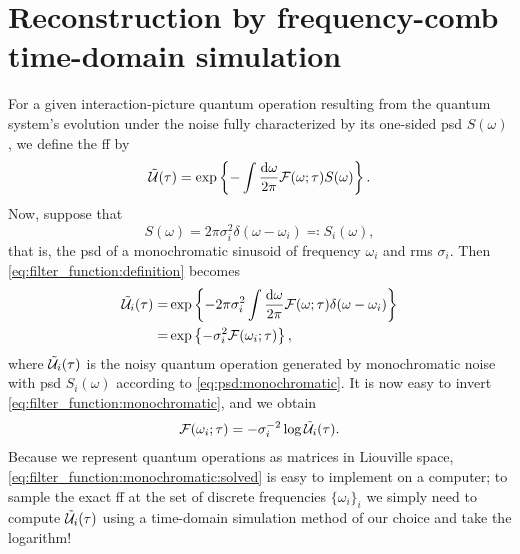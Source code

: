 \chapter{Reconstruction by frequency-comb time-domain simulation}\label{ch:filter_functions:validation}
For a {\color{RWTHmagenta75} given} interaction-picture quantum operation \liouvUe resulting from the quantum system's evolution under the noise fully characterized by its one-sided \gls{psd} $S(\omega)$, we define the \gls{ff} \FF by
\begin{align}
    \label{eq:filter_function:definition}
    \mathcal{\tilde{U}}(\tau) = \exp\left\{-\int\frac{\dd{\omega}}{2\pi}\mathcal{F}(\omega;\tau) S(\omega)\right\}.
\end{align}
Now, suppose that
\begin{equation}
    \label{eq:psd:monochromatic}
    S(\omega) = 2\pi\sigma_i^2 \delta(\omega - \omega_i) \eqqcolon S_i(\omega),
\end{equation} 
that is, the \gls{psd} of a monochromatic sinusoid of frequency $\omega_i$ and \gls{rms} $\sigma_i$.
Then \cref{eq:filter_function:definition} becomes
\begin{equation}
    \label{eq:filter_function:monochromatic}
    \begin{split}
        \mathcal{\tilde{U}}_i(\tau) =& \exp\left\lbrace -2\pi\sigma_i^2\int\frac{\dd{\omega}}{2\pi}\mathcal{F}(\omega;\tau)\delta(\omega - \omega_i)\right\rbrace \\
                                  =& \exp\left\lbrace -\sigma_i^2\mathcal{F}(\omega_i;\tau)\right\rbrace,
    \end{split}
\end{equation}
where $\mathcal{\tilde{U}}_i(\tau)$ is the noisy quantum operation generated by monochromatic noise with \gls{psd} $S_i(\omega)$ according to \cref{eq:psd:monochromatic}.
It is now easy to invert \cref{eq:filter_function:monochromatic}, and we obtain
\begin{align}
    \label{eq:filter_function:monochromatic:solved}
    \mathcal{F}(\omega_i; \tau) = -\sigma_i^{-2}\log\mathcal{\tilde{U}}_i(\tau).
\end{align}
Because we represent quantum operations as matrices in Liouville space, \cref{eq:filter_function:monochromatic:solved} is easy to implement on a computer; to sample the exact \gls{ff} at the set of discrete frequencies $\lbrace\omega_i\rbrace_i$ we simply need to compute $\mathcal{\tilde{U}}_i(\tau)$  using a time-domain simulation method of our choice and take the logarithm!

